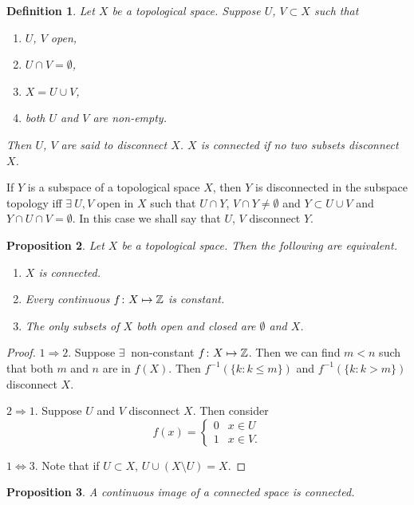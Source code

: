 \documentclass{notes}
\theoremstyle{plain}
\newtheorem{proposition}{Proposition}[chapter]
\newtheorem{definition}[proposition]{Definition}
\begin{document}
\begin{definition}
Let $X$ be a topological space.  Suppose $U$, $V \subset X$ such that
\begin{enumerate}
\item $U$, $V$ open,
\item $U \cap V = \emptyset$,
\item $X = U \cup V$,
\item both $U$ and $V$ are non-empty.
\end{enumerate}
Then $U$, $V$ are said to disconnect $X$.  $X$ is connected%
 if no two subsets disconnect $X$.
\end{definition}

If $Y$ is a subspace of a topological space $X$, then $Y$ is disconnected in
the subspace topology iff $\exists\ U,V$ open in $X$ such that $U \cap Y$,
$V \cap Y \ne \emptyset$ and $Y \subset U \cup V$ and $Y \cap U \cap V =
\emptyset$.  In this case we shall say that $U$, $V$ disconnect $Y$.

\begin{proposition}
Let $X$ be a topological space.  Then the following are equivalent.
\begin{enumerate}
\item $X$ is connected.
\item Every continuous $f \colon X \mapsto \mathbb{Z}$ is constant.
\item The only subsets of $X$ both open and closed are $\emptyset$ and $X$.
\end{enumerate}
\end{proposition}

\begin{proof}
$1 \Rightarrow 2$.  Suppose $\exists\ $ non-constant $f \colon X \mapsto \mathbb{Z}$.  Then
we can find $m < n$ such that both $m$ and $n$ are in $f(X)$.  Then
$f^{-1}(\{ k : k \le m \})$ and $f^{-1}(\{k : k > m \})$ disconnect $X$.

$2 \Rightarrow 1$.  Suppose $U$ and $V$ disconnect $X$.  Then consider
\[
f(x) =
\begin{cases}
0 & x \in U \\
1 & x \in V.
\end{cases}
\]

$1 \Leftrightarrow 3$.  Note that if $U \subset X$, $U \cup ( X \setminus U )
= X$.
\end{proof}

\begin{proposition}
A continuous image of a connected space is connected.
\end{proposition}
\end{document}
